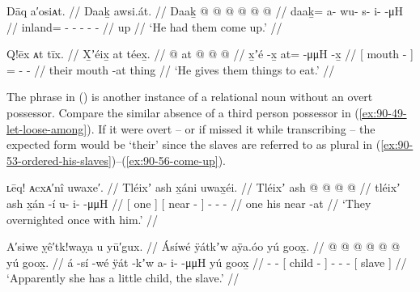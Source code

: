 \ex\label{ex:90-56-come-up}%
%
\begingl
	\glpreamble	Dāq a′osiᴀt. //
	\glpreamble	Daaḵ awsi.át. //
	\gla	Daaḵ @  @ {} @ {} @ {} @ {} @ {} //
	\glb	daaḵ= a- wu- s- i-  -μH //
	\glc	inland= - - - -  - //
	\gld	up  {} {} {} {} {} //
	\glft	‘He had them come up.’
		//
\endgl
\xe

\ex\label{ex:90-57-give-to-eat}%
%
\begingl
	\glpreamble	Q!ēx ᴀt tīx. //
	\glpreamble	X̱ʼéix̱ at téex̱. //
	\gla	{} {}  @ {} {}
		at @  @ {} @ {} //
	\glb	{} {} x̱ʼé -x̱ {}
		at=  -μμH -x̱ //
	\glc	{}[  mouth - {}]
		=  - - //
	\gld	{} their mouth -at {}
		thing  {} {} //
	\glft	‘He gives them things to eat.’
		//
\endgl
\xe

The phrase  in (\lastx) is another instance of a relational noun without an overt possessor.
Compare the similar absence of a third person possessor in (\ref{ex:90-49-let-loose-among}).
If it were overt – or if \citeauthor{swanton:1909} missed it while transcribing – the expected form would be  ‘their’ since the slaves are referred to as plural in (\ref{ex:90-53-ordered-his-slaves})–(\ref{ex:90-56-come-up}).

\ex\label{ex:90-58-overnight-once}%
%
\begingl
	\glpreamble	ʟēq! ᴀcxᴀ′nî uwaxe′. //
	\glpreamble	Tléixʼ ash x̱áni uwax̱éi. //
	\gla	{} Tléixʼ {} 
		{} ash  @ {} {}
		 @ {} @ {} @ {} //
	\glb	{} tléixʼ {}
		{} ash x̱án -í {}
		u- i-  -μμH //
	\glc	{}[ one {}]
		{}[  near - {}]
		- -  - //
	\gld	{} one {}
		{} his near -at {}
		 {} {} {} //
	\glft	‘They overnighted once with him.’
		//
\endgl
\xe

\ex\label{ex:90-59-slave-has-child}%
%
\begingl
	\glpreamble	A′siwe ỵê′tk!waỵa u yū′gux. //
	\glpreamble	Ásíwé ÿátkʼw aÿa.óo yú goox̱. //
	\gla	{} @ {} @ {}
		{}  @ {} {}
		 @ {} @ {} @ {} 
		{} yú goox̱. {} //
	\glb	á -sí -wé
		{} ÿát -kʼw {}
		a- i-  -μμH
		{} yú goox̱ {} //
	\glc	{} - -
		{}[ child - {}]
		- -  -
		{}[  slave {}] //
	\glft	‘Apparently she has a little child, the slave.’
		//
\endgl
\xe

